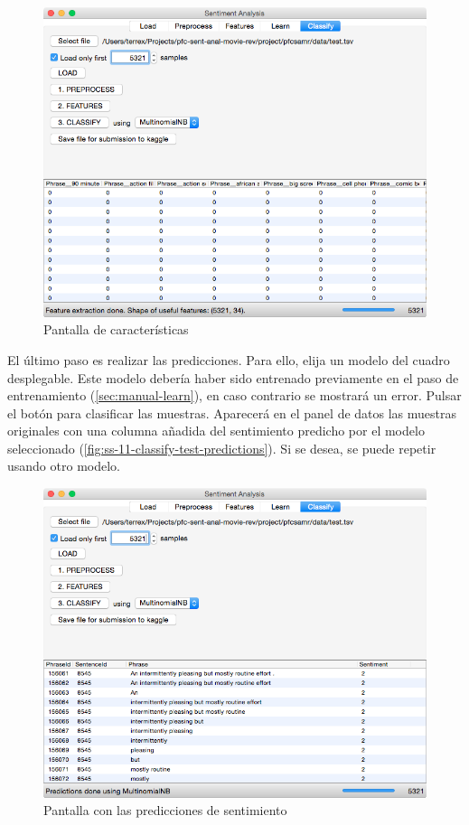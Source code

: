 \begin{figure}[H]
\centering
\includegraphics[width=14cm]{ss-10-classify-test-featured}
\caption{Pantalla de características}
\label{fig:ss-10-classify-test-featured}
\end{figure}


\newpage
El último paso es realizar las predicciones. Para ello, elija un modelo del cuadro desplegable. Este modelo debería haber sido entrenado previamente en el paso de entrenamiento (\autoref{sec:manual-learn}), en caso contrario se mostrará un error. Pulsar el botón  para clasificar las muestras. Aparecerá en el panel de datos las muestras originales con una columna añadida del sentimiento predicho por el modelo seleccionado (\autoref{fig:ss-11-classify-test-predictions}). Si se desea, se puede repetir usando otro modelo.

\begin{figure}[H]
\centering
\includegraphics[width=14cm]{ss-11-classify-test-predictions}
\caption{Pantalla con las predicciones de sentimiento}
\label{fig:ss-11-classify-test-predictions}
\end{figure}

